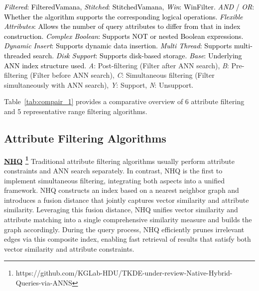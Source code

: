 \documentclass[sigconf, nonacm, pdfa]{acmart}
\begin{document}
{\begin{table}[t]
{\begin{minipage}{\linewidth}
		\textcolor{black}{
		\textit{Filtered}: FilteredVamana, \textit{Stitched}: StitchedVamana, \textit{Win}: WinFilter.
		\textit{AND} / \textit{OR}: Whether the algorithm supports the corresponding logical operations.
		\textit{Flexible Attributes}: Allows the number of query attributes to differ from that in index construction.
		\textit{Complex Boolean}: Supports NOT or nested Boolean expressions.
		\textit{Dynamic Insert}: Supports dynamic data insertion.
		\textit{Multi Thread}: Supports multi-threaded search.
		\textit{Disk Support}: Supports disk-based storage.
		\textit{Base}: Underlying ANN index structure used.}
		\textit{A}: Post-filtering (Filter after ANN search), 
		\textit{B}: Pre-filtering (Filter before ANN search), 
		\textit{C}: Simultaneous filtering (Filter simultaneously with ANN search), 
		\textit{Y}: Support, 
		\textit{N}: Unsupport. 
		\end{minipage}}
		
	\end{table}
	
	

	Table~\ref{tab:compair_1} provides a comparative overview of 6 attribute filtering and 5 representative range filtering algorithms. 
	
	\subsection{Attribute Filtering Algorithms}
	



	\noindent\textbf{\underline{NHQ} \footnote{https://github.com/KGLab-HDU/TKDE-under-review-Native-Hybrid-Queries-via-ANNS}}  \cite{NHQ}
	Traditional attribute filtering algorithms usually perform attribute constraints and ANN search separately. In contrast, NHQ is the first to implement simultaneous filtering, integrating both aspects into a unified framework. NHQ constructs an index based on a nearest neighbor graph and introduces a fusion distance that jointly captures vector similarity and attribute similarity. Leveraging this fusion distance, NHQ unifies vector similarity and attribute matching into a single comprehensive similarity measure and builds the graph accordingly. During the query process, NHQ efficiently prunes irrelevant edges via this composite index, enabling fast retrieval of results that satisfy both vector similarity and attribute constraints.
	
}
\end{document}
